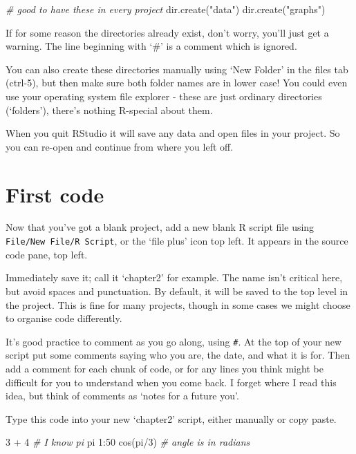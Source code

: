 \documentclass[
]{book}
\newenvironment{Shaded}{\begin{snugshade}}{\end{snugshade}}
\newcommand{\CommentTok}[1]{\textcolor[rgb]{0.56,0.35,0.01}{\textit{#1}}}
\newcommand{\DecValTok}[1]{\textcolor[rgb]{0.00,0.00,0.81}{#1}}
\newcommand{\FunctionTok}[1]{\textcolor[rgb]{0.00,0.00,0.00}{#1}}
\newcommand{\NormalTok}[1]{#1}
\newcommand{\SpecialCharTok}[1]{\textcolor[rgb]{0.00,0.00,0.00}{#1}}
\newcommand{\StringTok}[1]{\textcolor[rgb]{0.31,0.60,0.02}{#1}}
\begin{document}
\begin{Shaded}
\begin{Highlighting}[]
\CommentTok{\# good to have these in every project}
\FunctionTok{dir.create}\NormalTok{(}\StringTok{"data"}\NormalTok{)}
\FunctionTok{dir.create}\NormalTok{(}\StringTok{"graphs"}\NormalTok{)}
\end{Highlighting}
\end{Shaded}

If for some reason the directories already exist, don't worry, you'll just get a warning. The line beginning with `\#' is a comment which is ignored.

You can also create these directories manually using `New Folder' in the files tab (ctrl-5), but then make sure both folder names are in lower case! You could even use your operating system file explorer - these are just ordinary directories (`folders'), there's nothing R-special about them.

When you quit RStudio it will save any data and open files in your project. So you can re-open and continue from where you left off.

\hypertarget{first-code}{%
\section{First code}\label{first-code}}

Now that you've got a blank project, add a new blank R script file using \texttt{File/New\ File/R\ Script}, or the `file plus' icon top left. It appears in the source code pane, top left.

Immediately save it; call it `chapter2' for example. The name isn't critical here, but avoid spaces and punctuation. By default, it will be saved to the top level in the project. This is fine for many projects, though in some cases we might choose to organise code differently.

It's good practice to comment as you go along, using \texttt{\#}. At the top of your new script put some comments saying who you are, the date, and what it is for. Then add a comment for each chunk of code, or for any lines you think might be difficult for you to understand when you come back. I forget where I read this idea, but think of comments as `notes for a future you'.

Type this code into your new `chapter2' script, either manually or copy paste.

\begin{Shaded}
\begin{Highlighting}[]
\DecValTok{3} \SpecialCharTok{+} \DecValTok{4}
\CommentTok{\# I know pi}
\NormalTok{pi}
\DecValTok{1}\SpecialCharTok{:}\DecValTok{50}
\FunctionTok{cos}\NormalTok{(pi}\SpecialCharTok{/}\DecValTok{3}\NormalTok{) }\CommentTok{\# angle is in radians}
\end{Highlighting}
\end{Shaded}
\end{document}

